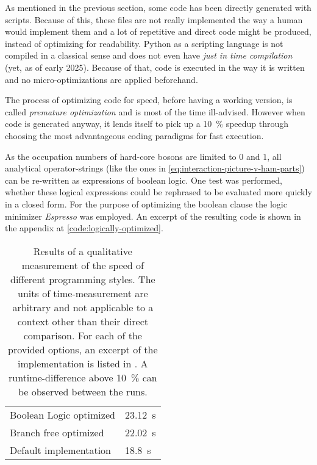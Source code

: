 As mentioned in the previous section, some code has been directly generated with scripts.
Because of this, these files are not really implemented the way a human would implement them and a lot of repetitive and direct code might be produced, instead of optimizing for readability.
Python as a scripting language is not compiled in a classical sense and does not even have \emph{just in time compilation} (yet, as of early 2025).
Because of that, code is executed in the way it is written and no micro-optimizations are applied beforehand.

The process of optimizing code for speed, before having a working version, is called \emph{premature optimization} and is most of the time ill-advised.
However when code is generated anyway, it lends itself to pick up a \SI{10}{\percent} speedup through choosing the most advantageous coding paradigms for fast execution.

As the occupation numbers of hard-core bosons are limited to $0$ and $1$, all analytical operator-strings (like the ones in \autoref{eq:interaction-picture-v-ham-parts}) can be re-written as expressions of boolean logic.
One test was performed, whether these logical expressions could be rephrased to be evaluated more quickly in a closed form. 
For the purpose of optimizing the boolean clause the logic minimizer \emph{Espresso} \cite{espresso} was employed.
An excerpt of the resulting code is shown in the appendix at \ref{code:logically-optimized}.

\begin{table}[htbp]
    \centering
    \begin{tabular}{l|l} 
        \toprule
             Boolean Logic optimized & \SI{23.12}{\second}\\
             Branch free optimized & \SI{22.02}{\second}\\
             Default implementation & \SI{18.8}{\second}\\
        \bottomrule
    \end{tabular}
    \vspace{0.5cm}
    \caption{
        Results of a qualitative measurement of the speed of different programming styles.
        The units of time-measurement are arbitrary and not applicable to a context other than their direct comparison.
        For each of the provided options, an excerpt of the implementation is listed in .
        A runtime-difference above \SI{10}{\percent} can be observed between the runs.
    }
    \label{table:style-optimizations-runtime}
\end{table}

